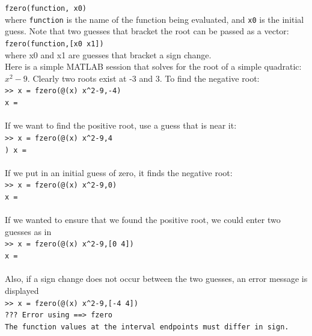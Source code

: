 \documentclass[../main.tex]{subfiles}
\begin{document}
\texttt{fzero(function, x0)}\\

\noindent where \texttt{function} is the name of the function being evaluated, and \texttt{x0} is the initial guess.
Note that two guesses that bracket the root can be passed as a vector:\\

\texttt{fzero(function,[x0 x1])}\\

\noindent where x0 and x1 are guesses that bracket a sign change.\\

\noindent Here is a simple MATLAB session that solves for the root of a simple quadratic: $x^2 - 9$.
Clearly two roots exist at -3 and 3. To find the negative root:\\

\texttt{>> x = fzero(@(x) x\textasciicircum2-9,-4)\\
\indent x =\\
\indent{}}\\

\noindent If we want to find the positive root, use a guess that is near it:\\

\texttt{>> x = fzero(@(x) x\textasciicircum2-9,4\\)
\indent x =\\
\indent{}}\\

\noindent If we put in an initial guess of zero, it finds the negative root:\\

\texttt{>> x = fzero(@(x) x\textasciicircum2-9,0)\\
\indent x =\\
\indent{}}\\

\noindent If we wanted to ensure that we found the positive root, we could enter two guesses as in\\

\texttt{>> x = fzero(@(x) x\textasciicircum2-9,[0 4])\\
\indent x =\\
\indent{}}\\

\noindent Also, if a sign change does not occur between the two guesses, an error message is displayed\\

\texttt{>> x = fzero(@(x) x\textasciicircum2-9,[-4 4])\\
\indent ??? Error using ==> fzero\\
\indent The function values at the interval endpoints must differ in sign.}\\
\end{document}
